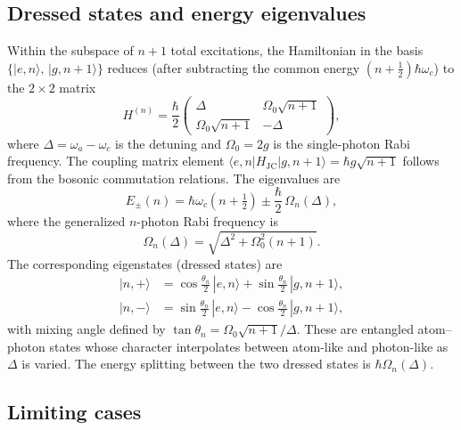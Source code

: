 \documentclass[12pt]{iopart}
\begin{document}
\subsection{Dressed states and energy eigenvalues}
\label{sec:dressed}

Within the subspace of $n{+}1$ total excitations, the Hamiltonian in the basis $\{|e, n\rangle,\, |g, n{+}1\rangle\}$ reduces (after subtracting the common energy $(n + \tfrac{1}{2})\hbar\omega_c$) to the $2 \times 2$ matrix
\begin{equation}
H^{(n)} = \frac{\hbar}{2}
\begin{pmatrix}
\Delta & \Omega_0\sqrt{n+1} \\
\Omega_0\sqrt{n+1} & -\Delta
\end{pmatrix},
\label{eq:2x2}
\end{equation}
where $\Delta = \omega_a - \omega_c$ is the detuning and $\Omega_0 = 2g$ is the single-photon Rabi frequency. The coupling matrix element $\langle e, n | H_{\text{JC}} | g, n{+}1\rangle = \hbar g\sqrt{n+1}$ follows from the bosonic commutation relations. The eigenvalues are
\begin{equation}
E_{\pm}(n) = \hbar\omega_c\left(n + \tfrac{1}{2}\right) \pm \frac{\hbar}{2}\,\Omega_n(\Delta),
\label{eq:eigenvalues}
\end{equation}
where the generalized $n$-photon Rabi frequency is
\begin{equation}
\Omega_n(\Delta) = \sqrt{\Delta^2 + \Omega_0^2(n+1)}.
\label{eq:gen_rabi}
\end{equation}
The corresponding eigenstates (dressed states) are
\begin{align}
|n,+\rangle &= \cos\tfrac{\theta_n}{2}\, |e,n\rangle + \sin\tfrac{\theta_n}{2}\, |g,n{+}1\rangle, \label{eq:dressed_plus}\\
|n,-\rangle &= \sin\tfrac{\theta_n}{2}\, |e,n\rangle - \cos\tfrac{\theta_n}{2}\, |g,n{+}1\rangle, \label{eq:dressed_minus}
\end{align}
with mixing angle defined by $\tan\theta_n = \Omega_0\sqrt{n+1}/\Delta$. These are entangled atom--photon states whose character interpolates between atom-like and photon-like as $\Delta$ is varied. The energy splitting between the two dressed states is $\hbar\Omega_n(\Delta)$.


\subsection{Limiting cases}
\label{sec:limits}
\end{document}
